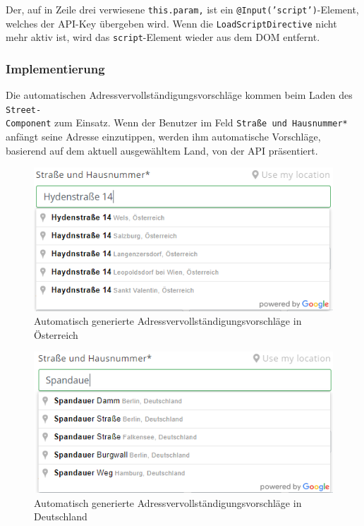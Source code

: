 Der, auf in Zeile drei verwiesene \texttt{this.param,} ist ein \texttt{@Input('script')}-Element, welches der API-Key übergeben wird. Wenn die \texttt{LoadScriptDirective} nicht mehr aktiv ist, wird das \texttt{script}-Element wieder aus dem DOM entfernt.

\subsubsection{Implementierung}
Die automatischen Adressvervollständigungsvorschläge kommen beim Laden des \texttt{Street-\\Component} zum Einsatz. Wenn der Benutzer im Feld \texttt{Straße und Hausnummer*} anfängt seine Adresse einzutippen, werden ihm automatische Vorschläge, basierend auf dem aktuell ausgewähltem Land, von der API präsentiert. 

\begin{figure}[H]
	\centerline{
		\includegraphics[width=1\textwidth, frame]{./grafiken/open_adress_completion.PNG}
	}
	\vskip0pt
	\caption{Automatisch generierte Adressvervollständigungsvorschläge in Österreich}
\end{figure}

\begin{figure}[H]
	\centerline{
		\includegraphics[width=1\textwidth, frame]{./grafiken/open_adress_completion_de.PNG}
	}
	\vskip0pt
	\caption{Automatisch generierte Adressvervollständigungsvorschläge in Deutschland}
\end{figure}

